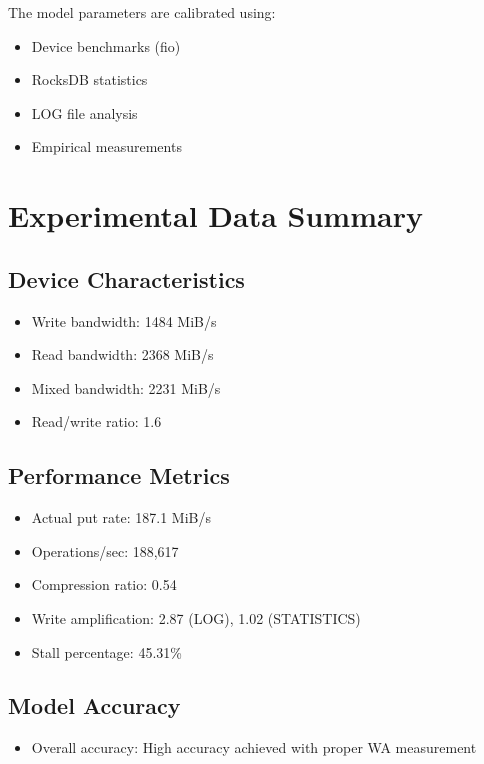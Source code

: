 \documentclass[11pt]{article}
\begin{document}
The model parameters are calibrated using:
\begin{itemize}
    \item Device benchmarks (fio)
    \item RocksDB statistics
    \item LOG file analysis
    \item Empirical measurements
\end{itemize}

\section{Experimental Data Summary}

\subsection{Device Characteristics}
\begin{itemize}
    \item Write bandwidth: 1484 MiB/s
    \item Read bandwidth: 2368 MiB/s
    \item Mixed bandwidth: 2231 MiB/s
    \item Read/write ratio: 1.6
\end{itemize}

\subsection{Performance Metrics}
\begin{itemize}
    \item Actual put rate: 187.1 MiB/s
    \item Operations/sec: 188,617
    \item Compression ratio: 0.54
    \item Write amplification: 2.87 (LOG), 1.02 (STATISTICS)
    \item Stall percentage: 45.31\%
\end{itemize}

\subsection{Model Accuracy}
\begin{itemize}
    \item Overall accuracy: High accuracy achieved with proper WA measurement
\end{itemize}
\end{document}

